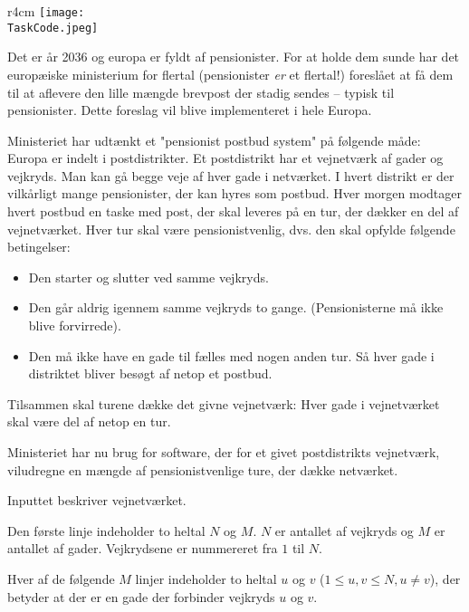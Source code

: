 \documentclass{boi2014-dk}
\renewcommand{\TaskCode}{postmen}
\begin{document}
    \begin{wrapfigure}[8]{r}{4cm}
        \vspace{-18pt}
		\texttt{[image: \\TaskCode.jpeg]}
	\end{wrapfigure}

    Det er år 2036 og europa er fyldt af pensionister. For at holde dem sunde
    har det europæiske ministerium for flertal (pensionister \emph{er} et
    flertal!) foreslået at få dem til at aflevere den lille mængde brevpost
    der stadig sendes -- typisk til pensionister. Dette foreslag vil blive
    implementeret i hele Europa.

    Ministeriet har udtænkt et "pensionist postbud system" på følgende måde:
    Europa er indelt i postdistrikter. Et postdistrikt har et vejnetværk af
    gader og vejkryds. Man kan gå begge veje af hver gade i netværket. I hvert
    distrikt er der vilkårligt mange pensionister, der kan hyres som postbud.
    Hver morgen modtager hvert postbud en taske med post, der skal leveres på
    en tur, der dækker en del af vejnetværket. Hver tur skal være
    pensionistvenlig, dvs. den skal opfylde følgende betingelser:

    \begin{itemize}
        \item Den starter og slutter ved samme vejkryds.
        \item Den går aldrig igennem samme vejkryds to gange. (Pensionisterne
            må ikke blive forvirrede).
        \item Den må ikke have en gade til fælles med nogen anden tur. Så hver
            gade i distriktet bliver besøgt af netop et postbud.
    \end{itemize}

    Tilsammen skal turene dække det givne vejnetværk: Hver gade i
    vejnetværket skal være del af netop en tur.

    \Task
    Ministeriet har nu brug for software, der for et givet postdistrikts
    vejnetværk, viludregne en mængde af pensionistvenlige ture, der
    dække netværket.

    \Input
    Inputtet beskriver vejnetværket.

    Den første linje indeholder to heltal $N$ og $M$. $N$ er antallet af
    vejkryds og $M$ er antallet af gader. Vejkrydsene er nummereret fra
    $1$ til $N$.

    Hver af de følgende $M$ linjer indeholder to heltal $u$ og $v$ ($1\le
    u,v\le N, u\ne v$), der betyder at der er en gade der forbinder vejkryds
    $u$ og $v$.
\end{document}
